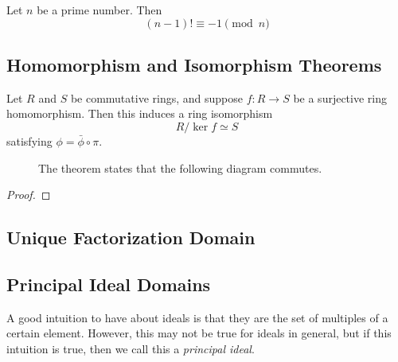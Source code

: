   \begin{theorem}
    Let $n$ be a prime number. Then 
    \begin{equation}
      (n-1)! \equiv -1 \pmod{n}
    \end{equation}
  \end{theorem}

\subsection{Homomorphism and Isomorphism Theorems}

  \begin{theorem}
    Let $R$ and $S$ be commutative rings, and suppose $f: R \rightarrow S$ be a surjective ring homomorphism. Then this induces a ring isomorphism
    \begin{equation}
      R /\ker{f} \simeq S
    \end{equation} 
    satisfying $\phi = \bar{\phi} \circ \pi$. 

    \begin{figure}[H]
      \centering 
      \caption{The theorem states that the following diagram commutes. } 
      \label{fig:fund_ring_homo_theorem}
    \end{figure}
  \end{theorem}
  \begin{proof}
    
  \end{proof} 

\subsection{Unique Factorization Domain}

\subsection{Principal Ideal Domains}

  A good intuition to have about ideals is that they are the set of multiples of a certain element. However, this may not be true for ideals in general, but if this intuition is true, then we call this a \textit{principal ideal}. 

